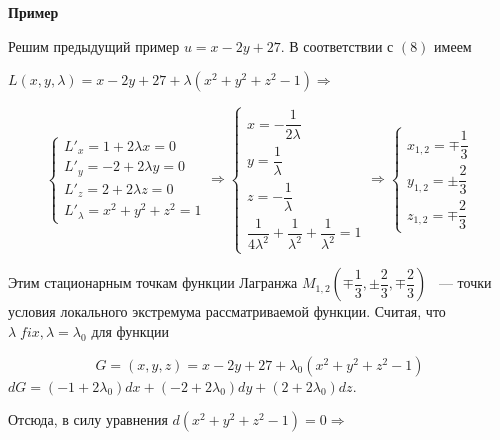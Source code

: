 \documentclass[../../main.tex]{subfiles}
\begin{document}
	\textbf{Пример}
	
	Решим предыдущий пример $u = x - 2y + 27$. В соответствии с $\left( 8 \right)$ 
	имеем 
	
	$L \left( x, y, \lambda \right) = x - 2y + 27 + \lambda \left( x^2 + y^2 
	+ z^2 - 1 \right) \Rightarrow$ 
	
	\begin{equation}
	\begin{cases}
	L'_x = 1 + 2 \lambda x = 0 \\
	L'_y = -2 + 2 \lambda y = 0 \\
	L'_z = 2 + 2 \lambda z = 0 \\
	L'_\lambda = x^2 + y^2 + z^2 = 1
	\end{cases} \Rightarrow
	\begin{cases}
	x = -\dfrac{1}{2\lambda} \\
	y = \dfrac{1}{\lambda} \\
	z = -\dfrac{1}{\lambda} \\
	\dfrac{1}{4\lambda^2} + \dfrac{1}{\lambda^2} + \dfrac{1}{\lambda^2} = 1
	\end{cases} \Rightarrow
	\begin{cases}
	x_{1, 2} = \mp \dfrac{1}{3} \\
	y_{1, 2} = \pm \dfrac{2}{3} \\
	z_{1, 2} = \mp \dfrac{2}{3} 
	\end{cases}
	\end{equation}
	
	Этим стационарным точкам функции Лагранжа $M_{1, 2} \left( \mp \dfrac{1}{3}, 
	\pm \dfrac{2}{3}, \mp \dfrac{2}{3} \right) $ ~--- точки условия локального
	экстремума рассматриваемой функции. Считая, что $\lambda\; fix, 
	\lambda = \lambda_0$ для функции
	
	\[G = \left( x, y, z \right) = x - 2y + 27 + 
	\lambda_0\left( x^2 + y^2 + z^2 - 1 \right)\]
	$
	dG = \left( -1 + 2 \lambda_0 \right)dx + \left( -2 + 2\lambda_0 \right)dy 
	+ \left( 2 + 2 \lambda_0 \right) dz $.
	\smallskip
	
	Отсюда, в силу 	уравнения $d\left( x^2 + y^2 + z^2 - 1 \right) = 0 \Rightarrow$
	
\end{document}
